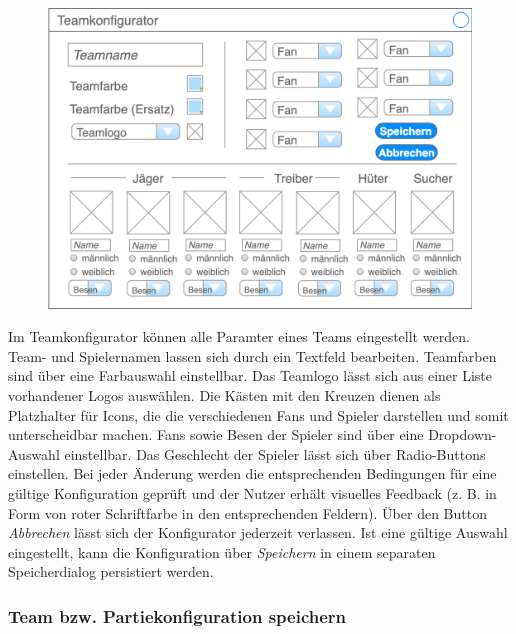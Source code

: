     \begin{figure}[H]
        \centering
        \includegraphics[width=\textwidth]{images/teamkonfigurator}
    \end{figure}

    Im Teamkonfigurator können alle Paramter eines Teams eingestellt werden. Team- und Spielernamen lassen sich durch ein Textfeld bearbeiten. Teamfarben sind über eine Farbauswahl einstellbar. Das Teamlogo lässt sich aus einer Liste vorhandener Logos auswählen. Die Kästen mit den Kreuzen dienen als Platzhalter für Icons, die die verschiedenen Fans und Spieler darstellen und somit unterscheidbar machen. Fans sowie Besen der Spieler sind über eine Dropdown-Auswahl einstellbar. Das Geschlecht der Spieler lässt sich über Radio-Buttons einstellen. Bei jeder Änderung werden die entsprechenden Bedingungen für eine gültige Konfiguration geprüft und der Nutzer erhält visuelles Feedback (z. B. in Form von roter Schriftfarbe in den entsprechenden Feldern). Über den Button \textit{Abbrechen} lässt sich der Konfigurator jederzeit verlassen. Ist eine gültige Auswahl eingestellt, kann die Konfiguration über \textit{Speichern} in einem separaten Speicherdialog persistiert werden.

    \subsubsection{Team bzw. Partiekonfiguration speichern}

